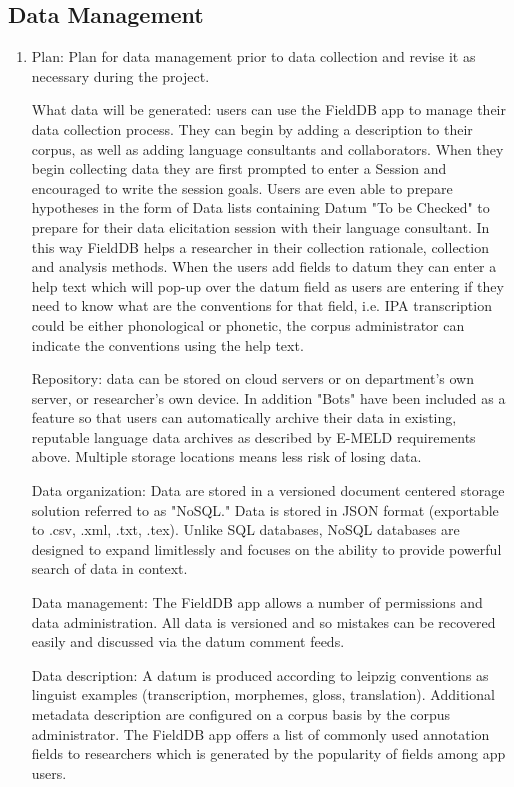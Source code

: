 \documentclass[12 pt]{article}
\begin{document}
\subsection {Data Management }

\begin{enumerate} 

\item Plan: Plan for data management prior to data collection and revise it as necessary during the project. 


What data will be generated: users can use the FieldDB app to manage their data collection process. They can begin by adding a description to their corpus, as well as adding language consultants and collaborators. When they begin collecting data they are first prompted to enter a Session and encouraged to write the session goals. Users are even able to prepare hypotheses in the form of Data lists containing Datum "To be Checked" to prepare for their data elicitation session with their language consultant. In this way FieldDB helps a researcher in their collection rationale, collection and analysis methods. When the users add fields to datum they can enter a help text which will pop-up over the datum field as users are entering if they need to know what are the conventions for that field, i.e. IPA transcription could be either phonological or phonetic, the corpus administrator can indicate the conventions using the help text. 

Repository:  data can be stored on cloud servers or on department's own server, or researcher's own device. In addition "Bots" have been included as a feature so that users can automatically archive their data in existing, reputable language data archives as described by E-MELD requirements above. Multiple storage locations means less risk of losing data.

Data organization: Data are stored in a versioned document centered storage solution referred to as "NoSQL." Data is stored in JSON format (exportable to .csv, .xml, .txt, .tex). Unlike SQL databases, NoSQL databases are designed to expand limitlessly and focuses on the ability to provide powerful search of data in context.

Data management: The FieldDB app allows a number of permissions and data administration. All data is versioned and so mistakes can be recovered easily and discussed via the datum comment feeds. 

Data description: A datum is produced according to leipzig conventions as linguist examples (transcription, morphemes, gloss, translation). Additional metadata description are configured on a corpus basis by the corpus administrator. The FieldDB app offers a list of commonly used annotation fields to researchers which is generated by the popularity of fields among app users. 


\end{enumerate}
\end{document}
